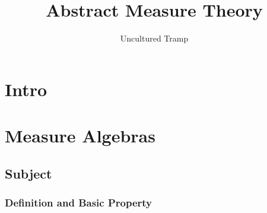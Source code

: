 \documentclass[12pt]{scrartcl}
\author{Uncultured Tramp}
\title{Abstract Measure Theory}
\renewcommand{\.}{\; . \;}
\begin{document}
\maketitle
\thispagestyle{empty}
\newpage
\thispagestyle{empty}
\tableofcontents
\newpage
\section*{Intro}
\newpage
{}
\section{Measure Algebras}
\subsection{Subject}
\subsubsection{Definition and Basic Property}
\end{document}
